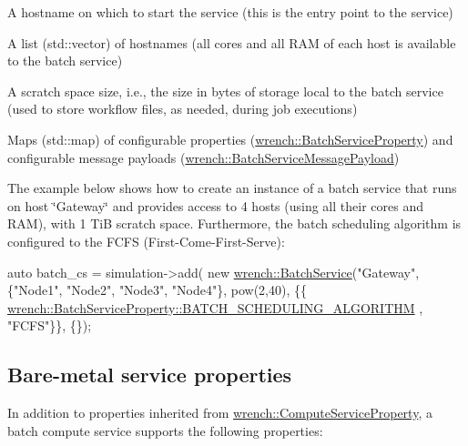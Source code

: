 \begin{DoxyItemize}
\item A hostname on which to start the service (this is the entry point to the service)
\item A list ({\ttfamily std\+::vector}) of hostnames (all cores and all R\+AM of each host is available to the batch service)
\item A scratch space size, i.\+e., the size in bytes of storage local to the batch service (used to store workflow files, as needed, during job executions)
\item Maps ({\ttfamily std\+::map}) of configurable properties ({\ttfamily \hyperlink{classwrench_1_1_batch_service_property}{wrench\+::\+Batch\+Service\+Property}}) and configurable message payloads ({\ttfamily \hyperlink{classwrench_1_1_batch_service_message_payload}{wrench\+::\+Batch\+Service\+Message\+Payload}})
\end{DoxyItemize}

The example below shows how to create an instance of a batch service that runs on host \char`\"{}\+Gateway\char`\"{} and provides access to 4 hosts (using all their cores and R\+AM), with 1 TiB scratch space. Furthermore, the batch scheduling algorithm is configured to the F\+C\+FS (First-\/\+Come-\/\+First-\/\+Serve)\+:


\begin{DoxyCode}
\textcolor{keyword}{auto} batch\_cs = simulation->add(
          \textcolor{keyword}{new} \hyperlink{classwrench_1_1_batch_service}{wrench::BatchService}(\textcolor{stringliteral}{"Gateway"}, 
                                   \{\textcolor{stringliteral}{"Node1"}, \textcolor{stringliteral}{"Node2"}, \textcolor{stringliteral}{"Node3"}, \textcolor{stringliteral}{"Node4"}\},
                                   pow(2,40),
                                   \{\{
      \hyperlink{classwrench_1_1_batch_service_property_aceb0af1c33f5ff2da347f54a484ce32e}{wrench::BatchServiceProperty::BATCH\_SCHEDULING\_ALGORITHM}
      , \textcolor{stringliteral}{"FCFS"}\}\},
                                   \{\});
\end{DoxyCode}
\hypertarget{guide-batch_guide-baremetal-creating-properties}{}\subsection{Bare-\/metal service properties}\label{guide-batch_guide-baremetal-creating-properties}
In addition to properties inherited from {\ttfamily \hyperlink{classwrench_1_1_compute_service_property}{wrench\+::\+Compute\+Service\+Property}}, a batch compute service supports the following properties\+:


